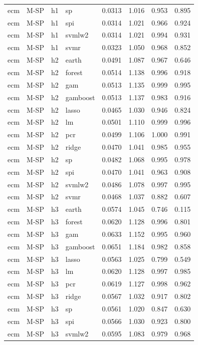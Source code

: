 \begin{ThreePartTable}
\begin{longtable}[t]{llclcccc}
ecm & M-SP & h1 & sp & 0.0313 & 1.016 & 0.953 & 0.895\\
ecm & M-SP & h1 & spi & 0.0314 & 1.021 & 0.966 & 0.924\\
ecm & M-SP & h1 & svmlw2 & 0.0314 & 1.021 & 0.994 & 0.931\\
ecm & M-SP & h1 & svmr & 0.0323 & 1.050 & 0.968 & 0.852\\
\addlinespace
ecm & M-SP & h2 & earth & 0.0491 & 1.087 & 0.967 & 0.646\\
ecm & M-SP & h2 & forest & 0.0514 & 1.138 & 0.996 & 0.918\\
ecm & M-SP & h2 & gam & 0.0513 & 1.135 & 0.999 & 0.995\\
ecm & M-SP & h2 & gamboost & 0.0513 & 1.137 & 0.983 & 0.916\\
ecm & M-SP & h2 & lasso & 0.0465 & 1.030 & 0.946 & 0.824\\
ecm & M-SP & h2 & lm & 0.0501 & 1.110 & 0.999 & 0.996\\
ecm & M-SP & h2 & pcr & 0.0499 & 1.106 & 1.000 & 0.991\\
ecm & M-SP & h2 & ridge & 0.0470 & 1.041 & 0.985 & 0.955\\
ecm & M-SP & h2 & sp & 0.0482 & 1.068 & 0.995 & 0.978\\
ecm & M-SP & h2 & spi & 0.0470 & 1.041 & 0.963 & 0.908\\
ecm & M-SP & h2 & svmlw2 & 0.0486 & 1.078 & 0.997 & 0.995\\
ecm & M-SP & h2 & svmr & 0.0468 & 1.037 & 0.882 & 0.607\\
\addlinespace
ecm & M-SP & h3 & earth & 0.0574 & 1.045 & 0.746 & 0.115\\
ecm & M-SP & h3 & forest & 0.0620 & 1.128 & 0.996 & 0.801\\
ecm & M-SP & h3 & gam & 0.0633 & 1.152 & 0.995 & 0.960\\
ecm & M-SP & h3 & gamboost & 0.0651 & 1.184 & 0.982 & 0.858\\
ecm & M-SP & h3 & lasso & 0.0563 & 1.025 & 0.799 & 0.549\\
ecm & M-SP & h3 & lm & 0.0620 & 1.128 & 0.997 & 0.985\\
ecm & M-SP & h3 & pcr & 0.0619 & 1.127 & 0.998 & 0.962\\
ecm & M-SP & h3 & ridge & 0.0567 & 1.032 & 0.917 & 0.802\\
ecm & M-SP & h3 & sp & 0.0561 & 1.020 & 0.847 & 0.630\\
ecm & M-SP & h3 & spi & 0.0566 & 1.030 & 0.923 & 0.800\\
ecm & M-SP & h3 & svmlw2 & 0.0595 & 1.083 & 0.979 & 0.968\\

\end{longtable}
\end{ThreePartTable}
